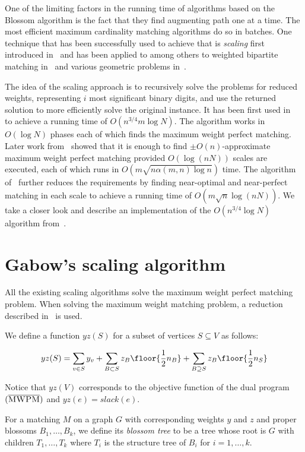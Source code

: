 
One of the limiting factors in the running time of algorithms based on the Blossom algorithm is the fact that they find augmenting path one at a time. The most efficient maximum cardinality matching algorithms do so in batches. One technique that has been successfully used to achieve that is \textit{scaling} first introduced in~\cite{edmonds1972theoretical} and has been applied to among others to weighted bipartite matching in~\cite{gabow1989faster} and various geometric problems in~\cite{gabow1984scaling}. 

The idea of the scaling approach is to recursively solve the problems for reduced weights, representing $i$ most significant binary digits, and use the returned solution to more efficiently solve the original instance. It has been first used in~\cite{gabow1985scaling} to achieve a running time of $O(n^{3/4}m \log N)$. The algorithm works in $O(\log N)$ phases each of which finds the maximum weight perfect matching. Later work from~\cite{gabow1991faster} showed that it is enough to find $\pm O(n)$-approximate maximum weight perfect matching provided $O(\log(nN))$ scales are executed, each of which runs in $O(m\sqrt{n \alpha(m,n)\log n})$ time. The algorithm of~\cite{duan2018scaling} further reduces the requirements by finding near-optimal and near-perfect matching in each scale to achieve a running time of $O(m \sqrt{n} \log(nN))$. We take a closer look and describe an implementation of the $O(n^{3/4}\log N)$ algorithm from~\cite{gabow1985scaling}.

\section{Gabow's scaling algorithm}

All the existing scaling algorithms solve the maximum weight perfect matching problem. When solving the maximum weight matching problem, a reduction described in~ is used.

We define a function $yz(S)$ for a subset of vertices $S \subseteq V$ as follows:

\[
yz(S) = \sum_{v \in S} y_v + \sum_{B \subset S} z_B \floor{\frac{1}{2}n_B} + \sum_{B \supseteq S} z_B \floor{\frac{1}{2}n_S}
\]

Notice that $yz(V)$ corresponds to the objective function of the dual program $(\overline{\textsc{MWPM}})$ and $yz(e) = slack(e)$.

\begin{defn}
    For a matching $M$ on a graph $G$ with corresponding weights $y$ and $z$ and proper blossoms $B_1, \dots, B_k$, we define its \emph{blossom tree} to be a tree whose root is $G$ with children $T_1, \dots, T_k$ where $T_i$ is the structure tree of $B_i$ for $i = 1, \dots, k$.
\end{defn}

